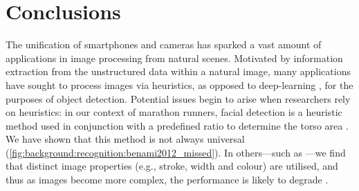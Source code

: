 \chapter{Conclusions}
\label{ch:conclusion}

The unification of smartphones and cameras has sparked a vast amount of applications in image processing from natural scenes. Motivated by information extraction from the unstructured data within a natural image, many applications have sought to process images via heuristics, as opposed to deep-learning , for the purposes of object detection. Potential issues begin to arise when researchers rely on heuristics: in our context of marathon runners, facial detection is a heuristic method used in conjunction with a predefined ratio to determine the torso area \citep{Benami:2012jf}. We have shown that this method is not always universal (\cref{fig:background:recognition:benami2012_missed}). In others---such as ---we find that distinct image properties (e.g., stroke, width and colour) are utilised, and thus as images become more complex, the performance is likely to degrade \citep{Li:2012wd}.




